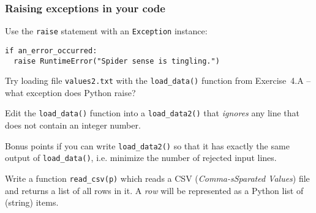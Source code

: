 \documentclass[english,serif,mathserif,xcolor=pdftex,dvipsnames,table]{beamer}
\begin{document}
\begin{frame}[fragile]
  \frametitle{Raising exceptions in your code}
  Use the \lstinline|raise| statement with an \texttt{Exception}
  instance:
\begin{lstlisting}
if an_error_occurred:
  raise RuntimeError("Spider sense is tingling.")
\end{lstlisting}
\end{frame}


\begin{frame}
  \begin{exercise*}[6.A]
    Try loading file \texttt{values2.txt} with the \lstinline`load_data()`
    function from Exercise~4.A -- what exception does Python raise?

    \+
    Edit the \lstinline`load_data()` function into a \lstinline`load_data2()`
    that \emph{ignores} any line that does not contain an integer number.

    \+
    Bonus points if you can write \lstinline`load_data2()` so that it has
    exactly the same output of \lstinline`load_data()`, i.e. minimize the number
    of rejected input lines.
  \end{exercise*}
\end{frame}

\begin{frame}
  \begin{exercise*}[6.B]
    Write a function \lstinline|read_csv(p)| which reads a CSV
    (\emph{Comma-sSparated Values}) file and returns a list of all
    rows in it.  A \emph{row} will be represented as a Python list of
    (string) items.
  \end{exercise*}

\end{frame}
\end{document}

